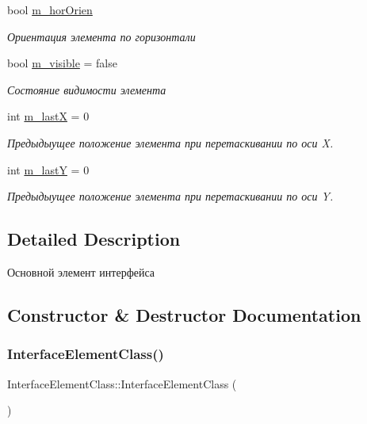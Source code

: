 \begin{DoxyCompactItemize}
bool \hyperlink{class_interface_element_class_a029cdb3ead496730b2aac67d0f22ba34}{m\+\_\+hor\+Orien}
\begin{DoxyCompactList}\small\item\em Ориентация элемента по горизонтали \end{DoxyCompactList}\item 
bool \hyperlink{class_interface_element_class_a734e2f12d7ca918619dda46ac2c4e56e}{m\+\_\+visible} = false
\begin{DoxyCompactList}\small\item\em Состояние видимости элемента \end{DoxyCompactList}\item 
int \hyperlink{class_interface_element_class_aa543f71120067c5cb3f4208a6e0fe3aa}{m\+\_\+lastX} = 0
\begin{DoxyCompactList}\small\item\em Предыдыущее положение элемента при перетаскивании по оси X. \end{DoxyCompactList}\item 
int \hyperlink{class_interface_element_class_abbd9a7e0ff18d4bb41d01aad1653f167}{m\+\_\+lastY} = 0
\begin{DoxyCompactList}\small\item\em Предыдыущее положение элемента при перетаскивании по оси Y. \end{DoxyCompactList}\end{DoxyCompactItemize}


\subsection{Detailed Description}
Основной элемент интерфейса 

\subsection{Constructor \& Destructor Documentation}
\mbox{\label{class_interface_element_class_aefb7fd1e3f6292cc38992d1dfa3d7efd}} 
\subsubsection{\texorpdfstring{Interface\+Element\+Class()}{InterfaceElementClass()}\hspace{0.1cm}{\footnotesize\ttfamily [1/2]}}
{\footnotesize\ttfamily Interface\+Element\+Class\+::\+Interface\+Element\+Class (\begin{DoxyParamCaption}{ }\end{DoxyParamCaption})}


